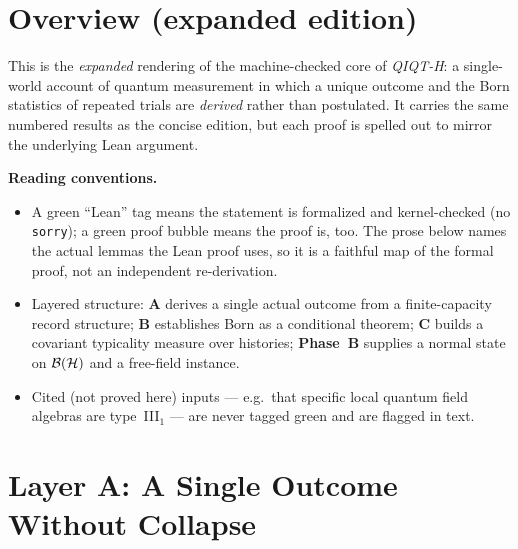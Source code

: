 
\chapter{Overview (expanded edition)}

This is the \emph{expanded} rendering of the machine-checked core of \emph{QIQT-H}:
a single-world account of quantum measurement in which a unique outcome and the Born
statistics of repeated trials are \emph{derived} rather than postulated. It carries
the same numbered results as the concise edition, but each proof is spelled out to
mirror the underlying Lean argument.

\medskip
\noindent\textbf{Reading conventions.}
\begin{itemize}
  \item A green ``Lean'' tag means the statement is formalized and kernel-checked
        (no \texttt{sorry}); a green proof bubble means the proof is, too. The prose
        below names the actual lemmas the Lean proof uses, so it is a faithful map of
        the formal proof, not an independent re-derivation.
  \item Layered structure: \textbf{A} derives a single actual outcome from a
        finite-capacity record structure; \textbf{B} establishes Born as a conditional
        theorem; \textbf{C} builds a covariant typicality measure over histories;
        \textbf{Phase~B} supplies a normal state on $\mathcal{B}(\mathcal{H})$ and a free-field instance.
  \item Cited (not proved here) inputs --- e.g.\ that specific local quantum field
        algebras are type~III$_1$ --- are never tagged green and are flagged in text.
\end{itemize}


\chapter{Layer A: A Single Outcome Without Collapse}
\label{chap:layerA}

